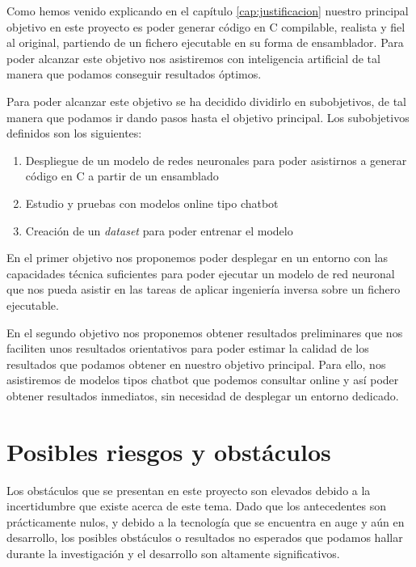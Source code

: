 
Como hemos venido explicando en el capítulo \ref{cap:justificacion} nuestro principal
objetivo en este proyecto es poder generar código en C compilable, realista y fiel
al original, partiendo de un fichero ejecutable en su forma de ensamblador. Para
poder alcanzar este objetivo nos asistiremos con inteligencia artificial de tal
manera que podamos conseguir resultados óptimos.

Para poder alcanzar este objetivo se ha decidido dividirlo en subobjetivos, de tal
manera que podamos ir dando pasos hasta el objetivo principal. Los subobjetivos definidos
son los siguientes:

\begin{enumerate}
    \item Despliegue de un modelo de redes neuronales para poder asistirnos a generar
        código en C a partir de un ensamblado
    \item Estudio y pruebas con modelos online tipo chatbot
    \item Creación de un \textit{dataset} para poder entrenar el modelo
\end{enumerate}

En el primer objetivo nos proponemos poder desplegar en un entorno con las capacidades
técnica suficientes para poder ejecutar un modelo de red neuronal que nos pueda asistir en
las tareas de aplicar ingeniería inversa sobre un fichero ejecutable.

En el segundo objetivo nos proponemos obtener resultados preliminares que nos faciliten
unos resultados orientativos para poder estimar la calidad de los resultados que podamos
obtener en nuestro objetivo principal. Para ello, nos asistiremos de modelos tipos chatbot
que podemos consultar online y así poder obtener resultados inmediatos, sin necesidad
de desplegar un entorno dedicado.

\section{Posibles riesgos y obstáculos}
\label{sec:riesgos}


Los obstáculos que se presentan en este proyecto son elevados debido a la incertidumbre
que existe acerca de este tema. Dado que los antecedentes son prácticamente nulos, y
debido a la tecnología que se encuentra en auge y aún en desarrollo, los posibles obstáculos
o resultados no esperados que podamos hallar durante la investigación y el desarrollo
son altamente significativos.

